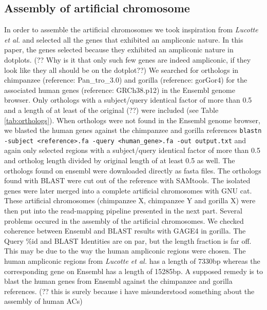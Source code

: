 \documentclass[
journal=jacsat, %
manuscript=article]{achemso}
\begin{document}
\subsection{Assembly of artificial chromosome}
In order to assemble the artificial chromosomes we took inspiration from \textit{Lucotte et al.\cite{LucotteDyn}} and selected all the genes that exhibited an ampliconic nature. In this paper, the genes selected because they exhibited an ampliconic nature in dotplots. (?? Why is it that only such few genes are indeed ampliconic, if they look like they all should be on the dotplot??) We searched for orthologs in chimpanzee (reference: Pan\_tro\_3.0) and gorilla (reference: gorGor4) for the associated human genes (reference: GRCh38.p12) in the Ensembl genome browser. Only orthologs with a subject/query identical factor of more than 0.5 and a length of at least of the original (??) were included (see Table \ref{tab:orthologs}). When orthologs were not found in the Ensembl genome browser, we blasted the human genes against the chimpanzee and gorilla references \texttt{blastn -subject <reference>.fa -query <human\_gene>.fa -out output.txt} and again only selected regions with a subject/query identical factor of more than 0.5 and ortholog length divided by original length of at least 0.5 as well. The orthologs found on ensembl were downloaded directly as fasta files. The orthologs found with BLAST were cut out of the reference with SAMtools. The isolated genes were later merged into a complete artificial chromosomes with GNU cat. These artificial chromosomes (chimpanzee X, chimpanzee Y and gorilla X) were then put into the read-mapping pipeline presented in the next part. Several problems occured in the assembly of the artificial chromosomes. We checked coherence between Ensembl and BLAST results with GAGE4 in gorilla. The Query \%id and BLAST Identities are on par, but the length fraction is far off. This may be due to the way the human ampliconic regions were chosen. The human ampliconic regions from \textit{Lucotte et al.\cite{LucotteDyn}} has a length of 7330bp whereas the corresponding gene on Ensembl has a length of 15285bp. A supposed remedy is to blast the human genes from Ensembl against the chimpanzee and gorilla references. (?? this is surely because i have misunderstood something about the assembly of human ACs)
\end{document}
